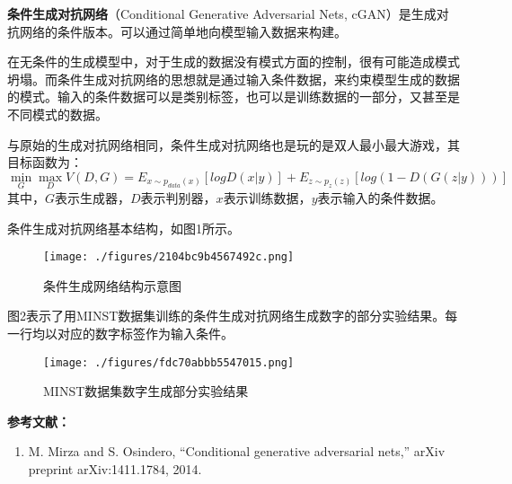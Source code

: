 
\textbf{条件生成对抗网络}（Conditional Generative Adversarial Nets, cGAN）是生成对抗网络的条件版本。可以通过简单地向模型输入数据来构建。

在无条件的生成模型中，对于生成的数据没有模式方面的控制，很有可能造成模式坍塌。而条件生成对抗网络的思想就是通过输入条件数据，来约束模型生成的数据的模式。输入的条件数据可以是类别标签，也可以是训练数据的一部分，又甚至是不同模式的数据。

与原始的生成对抗网络相同，条件生成对抗网络也是玩的是双人最小最大游戏，其目标函数为：
\begin{equation}
\mathop{\min}\limits_G \mathop {\max }\limits_D V(D,G)=E_{x\sim p_{data}(x)}[logD(x|y)]+E_{z\sim p_z(z)}[log(1-D(G(z|y)))]
\end{equation}
其中，$G$表示生成器，$D$表示判别器，$x$表示训练数据，$y$表示输入的条件数据。

条件生成对抗网络基本结构，如图1所示。
\begin{figure}[ht]
\centering
\texttt{[image: ./figures/2104bc9b4567492c.png]}
\caption{条件生成网络结构示意图} \label{fig_cGAN_1}
\end{figure}

图2表示了用MINST数据集训练的条件生成对抗网络生成数字的部分实验结果。每一行均以对应的数字标签作为输入条件。
\begin{figure}[ht]
\centering
\texttt{[image: ./figures/fdc70abbb5547015.png]}
\caption{MINST数据集数字生成部分实验结果} \label{fig_cGAN_2}
\end{figure}



\textbf{参考文献：}
\begin{enumerate}
\item M. Mirza and S. Osindero, “Conditional generative adversarial nets,” arXiv preprint arXiv:1411.1784, 2014.
\end{enumerate}